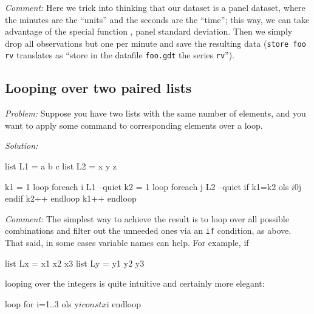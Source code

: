 \emph{Comment:} Here we trick  into thinking that our
dataset is a panel dataset, where the minutes are the ``units'' and
the seconds are the ``time''; this way, we can take advantage of the
special function , panel standard deviation.  Then we
simply drop all observations but one per minute and save the resulting
data (\texttt{store foo rv} translates as ``store in the 
datafile \texttt{foo.gdt} the series \texttt{rv}'').

\subsection{Looping over two paired lists}

\emph{Problem:} Suppose you have two lists with the same number of
elements, and you want to apply some command to corresponding elements
over a loop.

\emph{Solution:}
\begin{code}
list L1 = a b c
list L2 = x y z

k1 = 1
loop foreach i L1 --quiet
    k2 = 1
    loop foreach j L2 --quiet
        if k1=k2
            ols $i 0 $j
        endif
        k2++
    endloop
    k1++
endloop
\end{code}

\emph{Comment:} The simplest way to achieve the result is to loop over
all possible combinations and filter out the unneeded ones via an
\texttt{if} condition, as above. That said, in some cases variable
names can help. For example, if
\begin{code}
  list Lx = x1 x2 x3
  list Ly = y1 y2 y3
\end{code}
looping over the integers is quite intuitive and certainly more elegant:
\begin{code}
  loop for i=1..3
    ols y$i const x$i
  endloop
\end{code}


